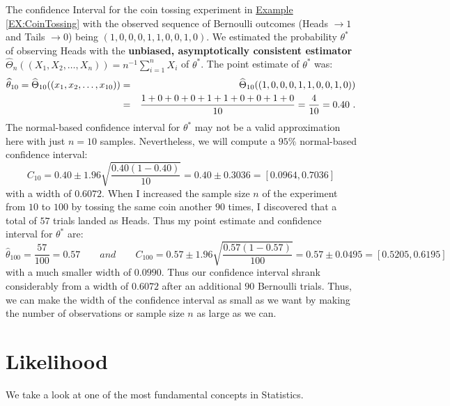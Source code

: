 \begin{example}
The confidence Interval for the coin tossing experiment in \hyperref[EX:CoinTossing]{Example \ref*{EX:CoinTossing}} with the observed sequence of Bernoulli outcomes (Heads $\to 1$ and Tails $\to 0$) being $(1,0,0,0,1,1,0,0,1,0)$.  We estimated the probability $\theta^*$ of observing Heads with the {\bf unbiased, asymptotically consistent estimator} $\widehat{\Theta}_n((X_1,X_2,\ldots,X_n))=n^{-1}\sum_{i=1}^{n} X_i$ of $\theta^*$.  The point estimate of $\theta^*$ was:
\begin{eqnarray}
\widehat{\theta}_{10} = \widehat{\Theta}_{10}((x_1,x_2,\ldots,x_{10})) 
&=&\widehat{\Theta}_{10}((1,0,0,0,1,1,0,0,1,0)) \notag \\
&=& \frac{1+0+0+0+1+1+0+0+1+0}{10}=\frac{4}{10}=0.40 \notag \ .
\end{eqnarray}
The normal-based confidence interval for $\theta^*$ may not be a valid approximation here with just $n=10$ samples.  Nevertheless, we will compute a $95\%$ normal-based confidence interval:
\[
C_{10} 
= 0.40 \pm 1.96 \sqrt{\frac{0.40(1-0.40)}{10}}
=0.40 \pm 0.3036
=[0.0964, 0.7036]
\]
with a width of $0.6072$.  When I increased the sample size $n$ of the experiment from $10$ to $100$ by tossing the same coin another $90$ times, I discovered that a total of $57$ trials landed as Heads.  Thus my point estimate and confidence interval for $\theta^*$ are:
\[
\widehat{\theta}_{100} = \frac{57}{100} = 0.57 \qquad and \qquad
C_{100} 
= 0.57 \pm 1.96 \sqrt{\frac{0.57(1-0.57)}{100}}
 = 0.57 \pm 0.0495
 =[0.5205, 0.6195]
\]
with a much smaller width of $0.0990$.  Thus our confidence interval shrank considerably from a width of $0.6072$ after an additional $90$ Bernoulli trials.  Thus, we can make the width of the confidence interval as small as we want by making the number of observations or sample size $n$ as large as we can.
\end{example}

\section{Likelihood}\label{S:Likelihood}
We take a look at one of the most fundamental concepts in Statistics.  

